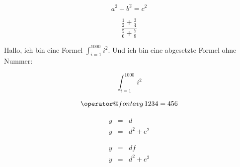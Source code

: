 \documentclass[12pt,ngerman,parskip=half]{scrreprt}
\makeatletter
\newcommand*\avg{\mathop{\operator@font avg}}
\makeatother
\begin{document}
\[ a^2+b^2=c^2\]


\[
\frac{
	\frac{1}{2} + \frac{3}{4}}
	{\frac{5}{6} + \frac{7}{8}}  \]
	

Hallo, ich bin eine Formel \(\int_{i=1}^{1000} i^2 \). Und ich bin eine abgesetzte Formel ohne Nummer:
	
\[ \int_{i=1}^{1000} i^2   \]
	
\[ \avg 1234 = 456 \]

\begin{eqnarray}
y &=& d \\
y &=& d^2 +e^2
\end{eqnarray}

\[
\begin{array}{lcr} 
y &=& d   f\\
y &=& d^2 +e^2
\end{array}
\]
\end{document}
